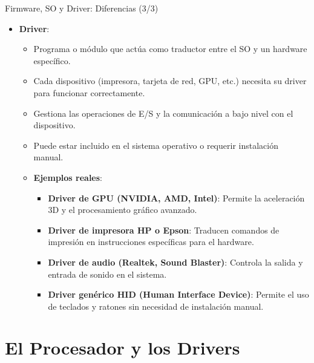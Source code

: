 \documentclass{beamer}
\begin{document}
\begin{frame}{Firmware, SO y Driver: Diferencias (3/3)}
    \begin{itemize}
        \item \textbf{Driver}:
            \begin{itemize}
                \item Programa o módulo que actúa como traductor entre el SO y un hardware específico.
                \item Cada dispositivo (impresora, tarjeta de red, GPU, etc.) necesita su driver para funcionar correctamente.
                \item Gestiona las operaciones de E/S y la comunicación a bajo nivel con el dispositivo.
                \item Puede estar incluido en el sistema operativo o requerir instalación manual.
                \item \textbf{Ejemplos reales}:
                    \begin{itemize}
                        \item \textbf{Driver de GPU (NVIDIA, AMD, Intel)}: Permite la aceleración 3D y el procesamiento gráfico avanzado.
                        \item \textbf{Driver de impresora HP o Epson}: Traducen comandos de impresión en instrucciones específicas para el hardware.
                        \item \textbf{Driver de audio (Realtek, Sound Blaster)}: Controla la salida y entrada de sonido en el sistema.
                        \item \textbf{Driver genérico HID (Human Interface Device)}: Permite el uso de teclados y ratones sin necesidad de instalación manual.
                    \end{itemize}
            \end{itemize}
    \end{itemize}
\end{frame}

\section{El Procesador y los Drivers}

\end{document}
